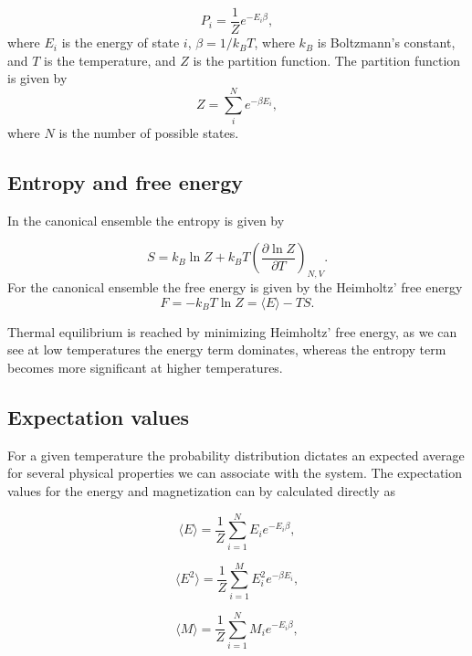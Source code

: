 \documentclass[a4paper]{article}
\begin{document}
\begin{equation}
    P_i = \frac{1}{Z}e^{-E_i\beta}, \label{eq:prob}
\end{equation}
where $E_i$ is the energy of state $i$, $\beta = 1/k_BT$, where $k_B$ is Boltzmann's constant, and $T$ is the temperature, and $Z$ is the partition function. The partition function is given by
\begin{equation}
    Z = \sum_{i}^{N}e^{-\beta E_i}, \label{eq:partifunc}
\end{equation}
where $N$ is the number of possible states.

\subsection{Entropy and free energy}
In the canonical ensemble the entropy is given by

\begin{equation}
    S = k_B\ln Z + k_BT\left(\frac{\partial\ln Z}{\partial T}\right)_{N,V}.
\end{equation}
For the canonical ensemble the free energy is given by the Heimholtz' free energy
\begin{equation}
    F = -k_BT\ln Z = \langle E \rangle -TS.
\end{equation}

Thermal equilibrium is reached by minimizing Heimholtz' free energy, as we can see at low temperatures the energy term dominates, whereas the entropy term becomes more significant at higher temperatures. 



\subsection{Expectation values}
For a given temperature the probability distribution dictates an expected average for several physical properties we can associate with the system. The expectation values for the energy and magnetization can by calculated directly as

\begin{equation}
    \langle E \rangle = \frac{1}{Z}\sum_{i=1}^{N}E_ie^{-E_i\beta},
  \end{equation} 
  
  \begin{equation}
    \langle E^2 \rangle=\frac{1}{Z}\sum_{i=1}^ME_i^2e^{-\beta E_i},
    \end{equation} 
    
  \begin{equation}
    \langle M \rangle = \frac{1}{Z}\sum_{i=1}^{N}M_ie^{-E_i\beta} \label{eq:E},
\end{equation} 
\end{document}
